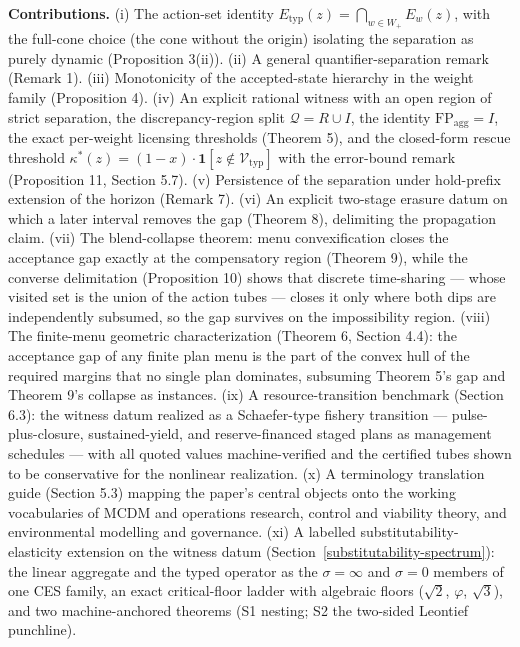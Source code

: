 \documentclass[3p,11pt]{elsarticle}
\begin{document}
\textbf{Contributions.} (i) The action-set identity \(E_{\mathrm{typ}}(z) = \bigcap_{w \in W_+} E_w(z)\), with the full-cone
choice (the cone without the origin) isolating the separation as purely
dynamic (Proposition 3(ii)). (ii) A general quantifier-separation remark
(Remark 1). (iii) Monotonicity of the accepted-state hierarchy in the
weight family (Proposition 4). (iv) An explicit rational witness with an
open region of strict separation, the discrepancy-region split
\(\mathcal{Q} = R \cup I\), the identity
\(\mathrm{FP}_{\mathrm{agg}} = I\), the exact per-weight licensing thresholds (Theorem 5), and the closed-form rescue threshold \(\kappa^*(z) = (1 - x)\cdot\mathbf{1}[z \notin \mathcal{V}_{\mathrm{typ}}]\) with the error-bound remark (Proposition 11, Section 5.7). (v) Persistence of the separation under
hold-prefix extension of the horizon (Remark 7). (vi) An explicit
two-stage erasure datum on which a later interval removes the gap
(Theorem 8), delimiting the propagation claim. (vii) The blend-collapse
theorem: menu convexification closes the acceptance gap exactly at the compensatory region (Theorem 9), while the converse
delimitation (Proposition 10) shows that discrete time-sharing --- whose
visited set is the union of the action tubes --- closes it only where
both dips are independently subsumed, so the gap survives on the
impossibility region. (viii) The finite-menu geometric characterization
(Theorem 6, Section 4.4): the acceptance gap of any finite plan menu is
the part of the convex hull of the required margins that no single plan
dominates, subsuming Theorem 5's gap and Theorem 9's collapse as
instances. (ix) A resource-transition benchmark
(Section 6.3): the witness datum realized as a Schaefer-type fishery
transition --- pulse-plus-closure, sustained-yield, and reserve-financed
staged plans as management schedules --- with all quoted values
machine-verified and the certified tubes shown to be conservative for the
nonlinear realization. (x) A terminology translation guide (Section 5.3)
mapping the paper's central objects onto the working vocabularies of MCDM
and operations research, control and viability theory, and environmental
modelling and governance. (xi) A labelled substitutability-elasticity
extension on the witness datum (Section~\ref{substitutability-spectrum}):
the linear aggregate and the typed operator as the \(\sigma = \infty\)
and \(\sigma = 0\) members of one CES family, an exact critical-floor
ladder with algebraic floors (\(\sqrt{2}\), \(\varphi\),
\(\sqrt{3}\)), and two machine-anchored theorems (S1 nesting; S2 the
two-sided Leontief punchline).
\end{document}
